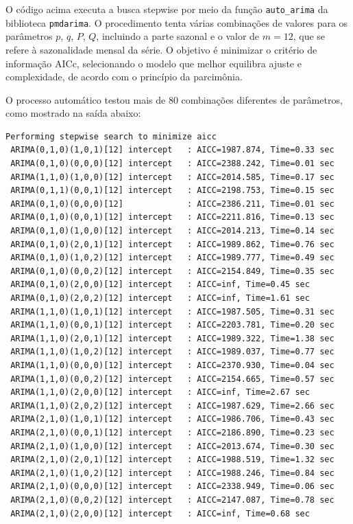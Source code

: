 \documentclass[a4paper, 12pt]{article}
\begin{document}
O código acima executa a busca stepwise por meio da função \texttt{auto\_arima} da biblioteca \texttt{pmdarima}. O procedimento tenta várias combinações de valores para os parâmetros \(p\), \(q\), \(P\), \(Q\), incluindo a parte sazonal e o valor de \(m=12\), que se refere à sazonalidade mensal da série. O objetivo é minimizar o critério de informação AICc, selecionando o modelo que melhor equilibra ajuste e complexidade, de acordo com o princípio da parcimônia.

O processo automático testou mais de 80 combinações diferentes de parâmetros, como mostrado na saída abaixo:

\begin{verbatim}
Performing stepwise search to minimize aicc
 ARIMA(0,1,0)(1,0,1)[12] intercept   : AICC=1987.874, Time=0.33 sec
 ARIMA(0,1,0)(0,0,0)[12] intercept   : AICC=2388.242, Time=0.01 sec
 ARIMA(1,1,0)(1,0,0)[12] intercept   : AICC=2014.585, Time=0.17 sec
 ARIMA(0,1,1)(0,0,1)[12] intercept   : AICC=2198.753, Time=0.15 sec
 ARIMA(0,1,0)(0,0,0)[12]             : AICC=2386.211, Time=0.01 sec
 ARIMA(0,1,0)(0,0,1)[12] intercept   : AICC=2211.816, Time=0.13 sec
 ARIMA(0,1,0)(1,0,0)[12] intercept   : AICC=2014.213, Time=0.14 sec
 ARIMA(0,1,0)(2,0,1)[12] intercept   : AICC=1989.862, Time=0.76 sec
 ARIMA(0,1,0)(1,0,2)[12] intercept   : AICC=1989.777, Time=0.49 sec
 ARIMA(0,1,0)(0,0,2)[12] intercept   : AICC=2154.849, Time=0.35 sec
 ARIMA(0,1,0)(2,0,0)[12] intercept   : AICC=inf, Time=0.45 sec
 ARIMA(0,1,0)(2,0,2)[12] intercept   : AICC=inf, Time=1.61 sec
 ARIMA(1,1,0)(1,0,1)[12] intercept   : AICC=1987.505, Time=0.31 sec
 ARIMA(1,1,0)(0,0,1)[12] intercept   : AICC=2203.781, Time=0.20 sec
 ARIMA(1,1,0)(2,0,1)[12] intercept   : AICC=1989.322, Time=1.38 sec
 ARIMA(1,1,0)(1,0,2)[12] intercept   : AICC=1989.037, Time=0.77 sec
 ARIMA(1,1,0)(0,0,0)[12] intercept   : AICC=2370.930, Time=0.04 sec
 ARIMA(1,1,0)(0,0,2)[12] intercept   : AICC=2154.665, Time=0.57 sec
 ARIMA(1,1,0)(2,0,0)[12] intercept   : AICC=inf, Time=2.67 sec
 ARIMA(1,1,0)(2,0,2)[12] intercept   : AICC=1987.629, Time=2.66 sec
 ARIMA(2,1,0)(1,0,1)[12] intercept   : AICC=1986.706, Time=0.43 sec
 ARIMA(2,1,0)(0,0,1)[12] intercept   : AICC=2186.890, Time=0.23 sec
 ARIMA(2,1,0)(1,0,0)[12] intercept   : AICC=2013.674, Time=0.30 sec
 ARIMA(2,1,0)(2,0,1)[12] intercept   : AICC=1988.519, Time=1.32 sec
 ARIMA(2,1,0)(1,0,2)[12] intercept   : AICC=1988.246, Time=0.84 sec
 ARIMA(2,1,0)(0,0,0)[12] intercept   : AICC=2338.949, Time=0.06 sec
 ARIMA(2,1,0)(0,0,2)[12] intercept   : AICC=2147.087, Time=0.78 sec
 ARIMA(2,1,0)(2,0,0)[12] intercept   : AICC=inf, Time=0.68 sec

\end{verbatim}
\end{document}
